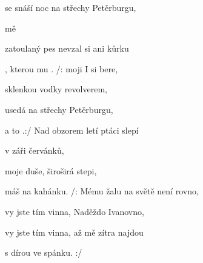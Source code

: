 

\zs
{} se snáší noc na střechy Petěrburgu,

  mě 

zatoulaný pes nevzal si ani kůrku

, kterou  mu .
\ks
\zr
/:  moji  I si bere,


 sklenkou vodky   revolverem,

 usedá na střechy Petěrburgu,

 a to .:/
\kr
\zs
Nad obzorem letí ptáci slepí

v záři červánků,

moje duše, široširá stepi,

máš na kahánku.
\ks
\zr
/: Mému žalu na světě není rovno,

vy jste tím vinna, Naděždo Ivanovno,

vy jste tím vinna, až mě zítra najdou

s dírou ve spánku. :/
\kr
\kp





